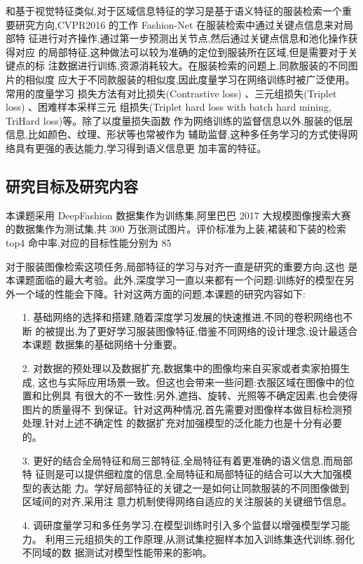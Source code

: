 和基于视觉特征类似,对于区域信息特征的学习是基于语义特征的服装检索一个重
要研究方向,CVPR2016 的工作 Fashion-Net\cite{liu2016deepfashion} 在服装检索中通过关键点信息来对局部特
征进行对齐操作,通过第一步预测出关节点,然后通过关键点信息和池化操作获得对应
的局部特征,这种做法可以较为准确的定位到服装所在区域,但是需要对于关键点的标
注数据进行训练,资源消耗较大。在服装检索的问题上,同款服装的不同图片的相似度
应大于不同款服装的相似度,因此度量学习在网络训练时被广泛使用。常用的度量学习
损失方法有对比损失(Contrastive loss)
、三元组损失(Triplet loss)
、困难样本采样三元
组损失(Triplet hard loss with batch hard mining, TriHard loss)等。除了以度量损失函数
作为网络训练的监督信息以外,服装的低层信息,比如颜色、纹理、形状等也常被作为
辅助监督,这种多任务学习的方式使得网络具有更强的表达能力,学习得到语义信息更
加丰富的特征。

\subsection{研究目标及研究内容}
本课题采用 DeepFashion\cite{liu2016deepfashion} 数据集作为训练集,阿里巴巴 2017 大规模图像搜索大赛
的数据集作为测试集,共 300 万张测试图片。评价标准为上装,裙装和下装的检索 top4
命中率,对应的目标性能分别为 85%

对于服装图像检索这项任务,局部特征的学习与对齐一直是研究的重要方向,这也
是本课题面临的最大考验。此外,深度学习一直以来都有一个问题:训练好的模型在另
外一个域的性能会下降。针对这两方面的问题,本课题的研究内容如下:
\begin{itemize}
  \item [1.] 基础网络的选择和搭建,随着深度学习发展的快速推进,不同的卷积网络也不断
    的被提出,为了更好学习服装图像特征,借鉴不同网络的设计理念,设计最适合本课题
    数据集的基础网络十分重要。

  \item [2.] 对数据的预处理以及数据扩充,数据集中的图像均来自买家或者卖家拍摄生成,
    这也与实际应用场景一致。但这也会带来一些问题:衣服区域在图像中的位置和比例具
    有很大的不一致性;另外,遮挡、旋转、光照等不确定因素,也会使得图片的质量得不
    到保证。针对这两种情况,首先需要对图像样本做目标检测预处理,针对上述不确定性
    的数据扩充对加强模型的泛化能力也是十分有必要的。

  \item [3.] 更好的结合全局特征和局三部特征,全局特征有着更准确的语义信息,而局部特
    征则是可以提供细粒度的信息,全局特征和局部特征的结合可以大大加强模型的表达能
    力。学好局部特征的关键之一是如何让同款服装的不同图像做到区域间的对齐,采用注
    意力机制使得网络自适应的关注服装的关键细节信息。

  \item [4.] 调研度量学习和多任务学习,在模型训练时引入多个监督以增强模型学习能力。
    利用三元组损失的工作原理,从测试集挖掘样本加入训练集迭代训练,弱化不同域的数
    据测试对模型性能带来的影响。

\end{itemize}
